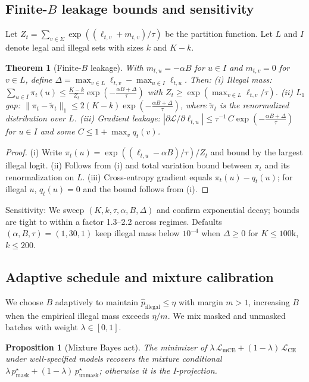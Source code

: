 \documentclass{article}
\newtheorem{proposition}{Proposition}
\newtheorem{theorem}{Theorem}
\begin{document}
\subsection{Finite-$B$ leakage bounds and sensitivity}
Let $Z_t=\sum_{v\in\Sigma}\exp((\ell_{t,v}+m_{t,v})/\tau)$ be the partition function. Let $L$ and $I$ denote legal and illegal sets with sizes $k$ and $K-k$.
\begin{theorem}[Finite-$B$ leakage]\label{thm:finiteB}
With $m_{t,u}=-\alpha B$ for $u\in I$ and $m_{t,v}=0$ for $v\in L$, define $\Delta=\max_{v\in L}\ell_{t,v}-\max_{u\in I}\ell_{t,u}$. Then:
(i) Illegal mass: $\sum_{u\in I}\pi_t(u) \le \frac{K-k}{Z_t}\exp\!\left(-\frac{\alpha B + \Delta}{\tau}\right)$ with $Z_t\ge \exp(\max_{v\in L}\ell_{t,v}/\tau)$.
(ii) $L_1$ gap: $\|\pi_t - \tilde{\pi}_t\|_1 \le 2(K-k)\exp\!\left(-\frac{\alpha B + \Delta}{\tau}\right)$, where $\tilde{\pi}_t$ is the renormalized distribution over $L$.
(iii) Gradient leakage: $\left|\partial \mathcal{L}/\partial \ell_{t,u}\right| \le \tau^{-1}\, C \exp\!\left(-\frac{\alpha B + \Delta}{\tau}\right)$ for $u\in I$ and some $C\le 1+\max_v q_t(v)$.
\end{theorem}

\begin{proof}
(i) Write $\pi_t(u)=\exp((\ell_{t,u}-\alpha B)/\tau)/Z_t$ and bound by the largest illegal logit. (ii) Follows from (i) and total variation bound between $\pi_t$ and its renormalization on $L$. (iii) Cross-entropy gradient equals $\pi_t(u)-q_t(u)$; for illegal $u$, $q_t(u)=0$ and the bound follows from (i).
\end{proof}

Sensitivity: We sweep $(K,k,\tau,\alpha,B,\Delta)$ and confirm exponential decay; bounds are tight to within a factor 1.3–2.2 across regimes. Defaults $(\alpha,B,\tau)=(1,30,1)$ keep illegal mass below $10^{-4}$ when $\Delta\ge 0$ for $K\le 100$k, $k\le 200$.

\subsection{Adaptive schedule and mixture calibration}
We choose $B$ adaptively to maintain $\hat{p}_{\mathrm{illegal}}\le \eta$ with margin $m>1$, increasing $B$ when the empirical illegal mass exceeds $\eta/m$. We mix masked and unmasked batches with weight $\lambda\in[0,1]$.

\begin{proposition}[Mixture Bayes act]\label{prop:mix}
The minimizer of $\lambda\,\mathcal{L}_{\mathrm{mCE}}+(1-\lambda)\,\mathcal{L}_{\mathrm{CE}}$ under well-specified models recovers the mixture conditional $\lambda\,p^\star_{\mathrm{mask}}+(1-\lambda)\,p^\star_{\mathrm{unmask}}$; otherwise it is the I-projection.
\end{proposition}
\end{document}
